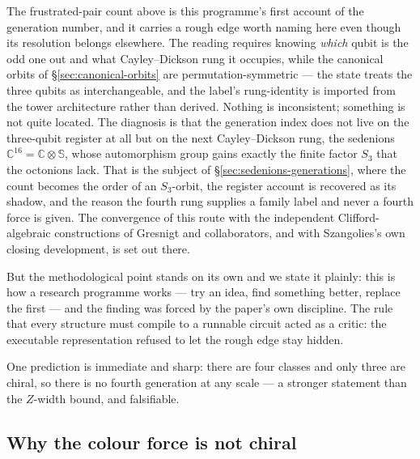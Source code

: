 The frustrated-pair count above is this programme's first account of the generation number, and it
carries a rough edge worth naming here even though its resolution belongs elsewhere. The reading
requires knowing \emph{which} qubit is the odd one out and what Cayley--Dickson rung it occupies,
while the canonical orbits of \S\ref{sec:canonical-orbits} are permutation-symmetric --- the state
treats the three qubits as interchangeable, and the label's rung-identity is imported from the tower
architecture rather than derived. Nothing is inconsistent; something is not quite located. The
diagnosis is that the generation index does not live on the three-qubit register at all but on the
next Cayley--Dickson rung, the sedenions $\mathbb{C}^{16} = \mathbb{C}\otimes\mathbb{S}$, whose
automorphism group gains exactly the finite factor $S_3$ that the octonions lack. That is the subject
of \S\ref{sec:sedenions-generations}, where the count becomes the order of an $S_3$-orbit, the
register account is recovered as its shadow, and the reason the fourth rung supplies a family label
and never a fourth force is given. The convergence of this route with the independent
Clifford-algebraic constructions of Gresnigt and collaborators, and with Szangolies's own closing
development, is set out there.

But the methodological point stands on its own and we state it plainly: this is how a
research programme works --- try an idea, find something better, replace the first --- and the
finding was forced by the paper's own discipline. The rule that every structure must compile to a
runnable circuit acted as a critic: the executable representation refused to let the rough edge
stay hidden.

One prediction is immediate and sharp: there are four classes and only three are chiral, so there is
no fourth generation at any scale --- a stronger statement than the $Z$-width bound, and falsifiable.


\subsection{Why the colour force is not chiral}
\label{sec:achirality-qcd}

